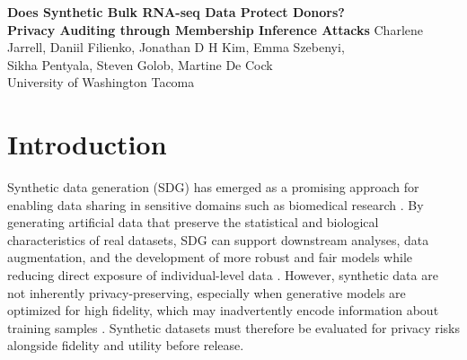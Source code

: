 \documentclass[11pt]{article}
\begin{document}
\begin{center}
\textbf{\Large Does Synthetic Bulk RNA-seq Data Protect Donors?\\
\vskip 5pt
Privacy Auditing through Membership Inference Attacks}
\vskip 5pt
Charlene Jarrell,
Daniil Filienko,
Jonathan D H Kim,
Emma Szebenyi,\\ 
 
Sikha Pentyala, 
Steven Golob, 
Martine De Cock\\
\vskip 5pt
University of Washington Tacoma
\end{center}
\vskip 5pt



\section{Introduction}\label{sec:intro}
Synthetic data generation (SDG) \cite{hu2023sok,ponomareva2025dp} has emerged as a promising approach for enabling data sharing in sensitive domains such as biomedical research \cite{menziessynthetic__camda, ozturk2026towards}. By generating artificial data that preserve the statistical and biological characteristics of real datasets, SDG can support downstream analyses, data augmentation, and the development of more robust and fair models while reducing direct exposure of individual-level data \cite{juwara2024evaluation}. However, synthetic data are not inherently privacy-preserving, especially when generative models are optimized for high fidelity, which may inadvertently encode information about training samples \cite{stadler2022synthetic}. Synthetic datasets must therefore be evaluated for privacy risks
alongside fidelity and utility before release.
\end{document}
